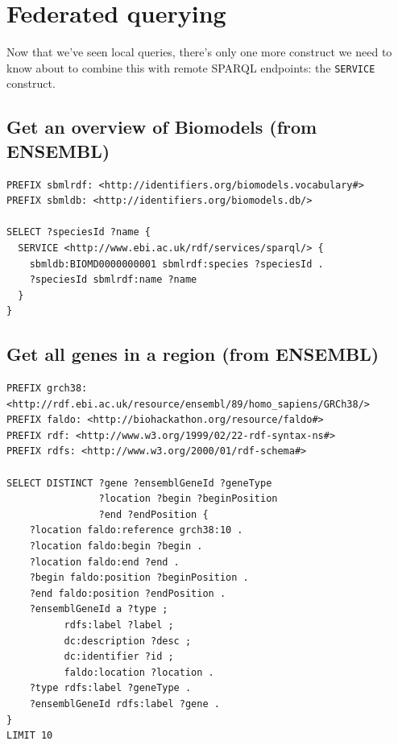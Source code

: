 \documentclass[11pt,a4paper,oneside]{book}
\begin{document}
\section{Federated querying}

  Now that we've seen local queries, there's only one more construct we need to
  know about to combine this with remote SPARQL endpoints: the \texttt{SERVICE}
  construct.
  
\subsection{Get an overview of Biomodels (from ENSEMBL)}
\begin{siderules}
\begin{verbatim}
PREFIX sbmlrdf: <http://identifiers.org/biomodels.vocabulary#>
PREFIX sbmldb: <http://identifiers.org/biomodels.db/>

SELECT ?speciesId ?name {
  SERVICE <http://www.ebi.ac.uk/rdf/services/sparql/> {
    sbmldb:BIOMD0000000001 sbmlrdf:species ?speciesId .
    ?speciesId sbmlrdf:name ?name
  }
}
\end{verbatim}
\end{siderules}

\subsection{Get all genes in a region (from ENSEMBL)}
\begin{siderules}
\begin{verbatim}
PREFIX grch38: <http://rdf.ebi.ac.uk/resource/ensembl/89/homo_sapiens/GRCh38/>
PREFIX faldo: <http://biohackathon.org/resource/faldo#>
PREFIX rdf: <http://www.w3.org/1999/02/22-rdf-syntax-ns#>
PREFIX rdfs: <http://www.w3.org/2000/01/rdf-schema#>

SELECT DISTINCT ?gene ?ensemblGeneId ?geneType 
                ?location ?begin ?beginPosition 
                ?end ?endPosition {
    ?location faldo:reference grch38:10 .
    ?location faldo:begin ?begin .
    ?location faldo:end ?end .
    ?begin faldo:position ?beginPosition .
    ?end faldo:position ?endPosition .
    ?ensemblGeneId a ?type ;
          rdfs:label ?label ;
          dc:description ?desc ;
          dc:identifier ?id ;
          faldo:location ?location .
    ?type rdfs:label ?geneType .
    ?ensemblGeneId rdfs:label ?gene .
}
LIMIT 10
\end{verbatim}
\end{siderules}

\end{document}

